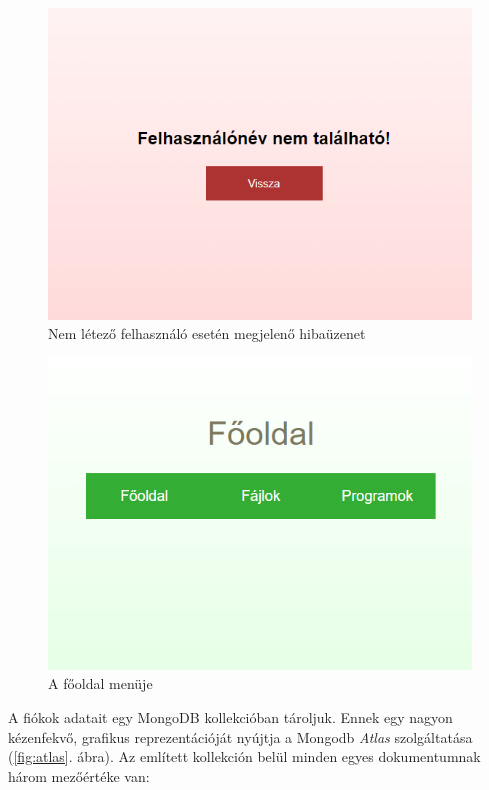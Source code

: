 \begin{figure}[h]
	\centering
		\includegraphics[width=10truecm, height=7truecm]{images/nincs_felhasznalo.png}
	\caption{Nem létező felhasználó esetén megjelenő hibaüzenet}
	\label{fig:loginError}
\end{figure}

\begin{figure}[h]
	\centering
		\includegraphics[width=10truecm, height=7truecm]{images/fooldal.png}
	\caption{A főoldal menüje}
	\label{fig:homeMenu}
\end{figure}

A fiókok adatait egy MongoDB kollekcióban tároljuk. Ennek egy nagyon kézenfekvő, grafikus reprezentációját nyújtja a Mongodb \textit{Atlas} szolgáltatása (\ref{fig:atlas}. ábra). Az említett kollekción belül minden egyes dokumentumnak három mezőértéke van:

